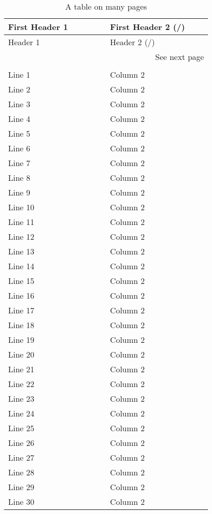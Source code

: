 \begin{longtable}{| p{0.4\linewidth} | p{0.4\linewidth} |}
\caption{\label{myTable2} A table on many pages}\\

\hline First Header 1 & First Header 2
(\pageref{firstLine}/\pageref{lastLine})
\label{firstLine}
\\ \hline \endfirsthead
\hline       Header 1 &       Header 2
(\pageref{firstLine}/\pageref{lastLine})
\\ \hline \endhead
\hline \multicolumn{2}{r}{See next page}
\\ \endfoot
\hline \multicolumn{2}{r}{End of Table}
\label{lastLine}
\\ \endlastfoot
Line  1 & Column 2 \\
Line  2 & Column 2 \\
Line  3 & Column 2 \\
Line  4 & Column 2 \\
Line  5 & Column 2 \\
Line  6 & Column 2 \\
Line  7 & Column 2 \\
Line  8 & Column 2 \\
Line  9 & Column 2 \\
Line 10 & Column 2 \\
Line 11 & Column 2 \\
Line 12 & Column 2 \\
Line 13 & Column 2 \\
Line 14 & Column 2 \\
Line 15 & Column 2 \\
Line 16 & Column 2 \\
Line 17 & Column 2 \\
Line 18 & Column 2 \\
Line 19 & Column 2 \\
Line 20 & Column 2 \\
Line 21 & Column 2 \\
Line 22 & Column 2 \\
Line 23 & Column 2 \\
Line 24 & Column 2 \\
Line 25 & Column 2 \\
Line 26 & Column 2 \\
Line 27 & Column 2 \\
Line 28 & Column 2 \\
Line 29 & Column 2 \\
Line 30 & Column 2 \\
\end{longtable}
